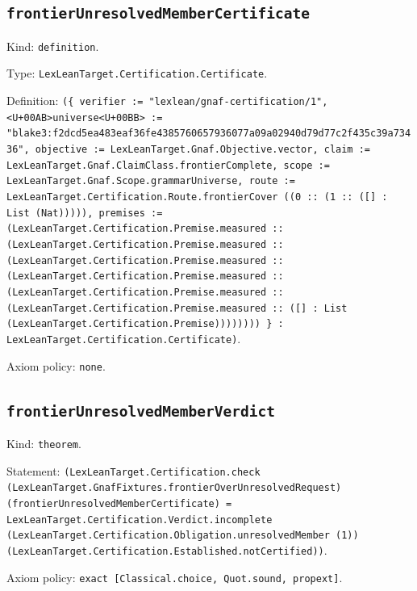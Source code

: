 \documentclass[11pt]{article}
\begin{document}
\subsection*{\texttt{frontierUnresolvedMemberCertificate}}
\noindent Kind: \texttt{definition}.\par
\noindent Type: \texttt{LexLeanTarget.Certification.Certificate}.\par
\noindent Definition: \texttt{(\{ verifier := "lexlean/gnaf-certification/1", <U+00AB>universe<U+00BB> := "blake3:f2dcd5ea483eaf36fe4385760657936077a09a02940d79d77c2f435c39a73436", objective := LexLeanTarget.Gnaf.Objective.vector, claim := LexLeanTarget.Gnaf.ClaimClass.frontierComplete, scope := LexLeanTarget.Gnaf.Scope.grammarUniverse, route := LexLeanTarget.Certification.Route.frontierCover ((0 :: (1 :: ([] : List (Nat))))), premises := (LexLeanTarget.Certification.Premise.measured :: (LexLeanTarget.Certification.Premise.measured :: (LexLeanTarget.Certification.Premise.measured :: (LexLeanTarget.Certification.Premise.measured :: (LexLeanTarget.Certification.Premise.measured :: (LexLeanTarget.Certification.Premise.measured :: ([] : List (LexLeanTarget.Certification.Premise)))))))) \} : LexLeanTarget.Certification.Certificate)}.\par
\noindent Axiom policy: \texttt{none}.\par
\subsection*{\texttt{frontierUnresolvedMemberVerdict}}
\noindent Kind: \texttt{theorem}.\par
\noindent Statement: \texttt{(LexLeanTarget.Certification.check (LexLeanTarget.GnafFixtures.frontierOverUnresolvedRequest) (frontierUnresolvedMemberCertificate) = LexLeanTarget.Certification.Verdict.incomplete (LexLeanTarget.Certification.Obligation.unresolvedMember (1)) (LexLeanTarget.Certification.Established.notCertified))}.\par
\noindent Axiom policy: \texttt{exact [Classical.choice, Quot.sound, propext]}.\par
\end{document}
